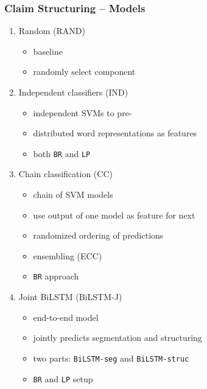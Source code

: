 \documentclass{beamer}
\begin{document}
\begin{frame}
	\frametitle{Claim Structuring -- Models}
	\begin{enumerate}

		\item Random (RAND)
			\begin{itemize}
				\item baseline
				\item randomly select component
			\end{itemize}
		\item Independent classifiers (IND)
			\begin{itemize}
				\item independent SVMs to pre-
				\item distributed word representations as features
				\item both \texttt{BR} and \texttt{LP}
			\end{itemize}
		\item Chain classification (CC)
			\begin{itemize}
				\item chain of SVM models
				\item use output of one model as feature for next
				\item randomized ordering of predictions
				\item ensembling (ECC)
				\item \texttt{BR} approach
			\end{itemize}
		\item Joint BiLSTM (BiLSTM-J)
			\begin{itemize}
				\item end-to-end model
				\item jointly predicts segmentation and structuring
				\item two parts: \texttt{BiLSTM-seg} and \texttt{BiLSTM-struc}
				\item \texttt{BR} and \texttt{LP} setup
			\end{itemize}
	\end{enumerate}

\end{frame}
\end{document}
